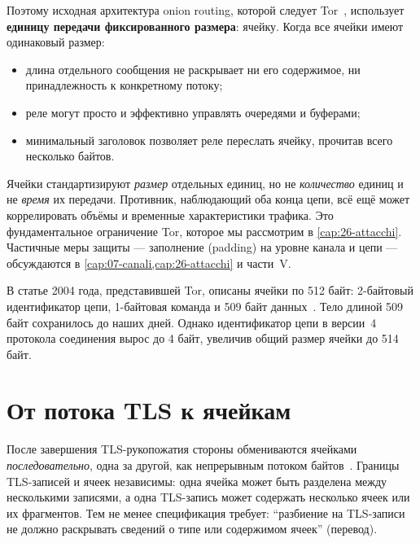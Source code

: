 Поэтому исходная архитектура onion routing, которой следует Tor~\cite{dingledine2004tor}, использует \textbf{единицу передачи фиксированного размера}: ячейку. Когда все ячейки имеют одинаковый размер:
\begin{itemize}
  \item длина отдельного сообщения не раскрывает ни его содержимое, ни принадлежность к конкретному потоку;
  \item реле могут просто и эффективно управлять очередями и буферами;
  \item минимальный заголовок позволяет реле переслать ячейку, прочитав всего несколько байтов.
\end{itemize}

\begin{attenzione}
Ячейки стандартизируют \emph{размер} отдельных единиц, но не \emph{количество} единиц и не \emph{время} их передачи. Противник, наблюдающий оба конца цепи, всё ещё может коррелировать объёмы и временные характеристики трафика. Это фундаментальное ограничение Tor, которое мы рассмотрим в \cref{cap:26-attacchi}. Частичные меры защиты --- заполнение (padding) на уровне канала и цепи --- обсуждаются в \cref{cap:07-canali,cap:26-attacchi} и части~V.
\end{attenzione}

\begin{storia}[512 байт]
В статье 2004 года, представившей Tor, описаны ячейки по 512 байт: 2-байтовый идентификатор цепи, 1-байтовая команда и 509 байт данных~\cite{dingledine2004tor}. Тело длиной 509 байт сохранилось до наших дней. Однако идентификатор цепи в версии~4 протокола соединения вырос до 4 байт, увеличив общий размер ячейки до 514 байт.
\end{storia}

\section{От потока TLS к ячейкам}\label{sec:celle-tls}

После завершения TLS-рукопожатия стороны обмениваются ячейками \emph{последовательно}, одна за другой, как непрерывным потоком байтов~. Границы TLS-записей и ячеек независимы: одна ячейка может быть разделена между несколькими записями, а одна TLS-запись может содержать несколько ячеек или их фрагментов. Тем не менее спецификация требует: \enquote{разбиение на TLS-записи не должно раскрывать сведений о типе или содержимом ячеек} (перевод).

